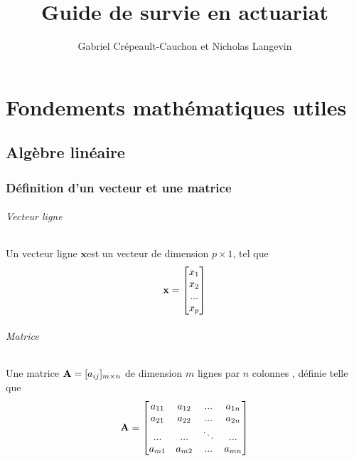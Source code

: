\documentclass[12pt, french]{report}
\author{Gabriel Crépeault-Cauchon et Nicholas Langevin}
\title{Guide de survie en actuariat}
\begin{document}
\maketitle
\newpage
\tableofcontents
\newpage

\part{Fondements mathématiques utiles}

\chapter{Algèbre linéaire}

\section{Définition d'un vecteur et une matrice}
\paragraph{Vecteur ligne} Un vecteur ligne $\bm{x}$est un vecteur de dimension $p \times 1$, tel que
\begin{align*}
\mathbf{x} = 
\begin{bmatrix}
x_1 \\
x_2 \\
... \\
x_p \\
\end{bmatrix}
\end{align*}

\paragraph{Matrice} Une matrice $\mathbf{A}=[a_{ij}]_{m \times n}$  de dimension $m$ lignes par $n$ colonnes , définie telle que
\begin{equation}
\label{eq:matrice-base}
\mathbf{A} = 
\begin{bmatrix}
a_{11}    & a_{12}    &  ...   &  a_{1n} \\
a_{21}    & a_{22}    &  ...   &  a_{2n} \\
...    & ...    &  \ddots   &  ... \\
a_{m1}    & a_{m2}    &  ...   &  a_{mn} \\
\end{bmatrix}
\end{equation}
\end{document}
